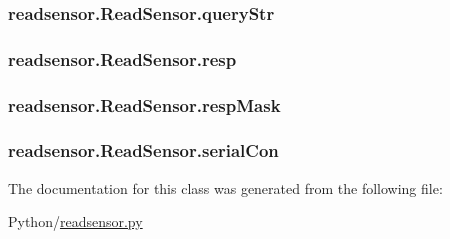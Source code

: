 \subsubsection[{\texorpdfstring{query\+Str}{queryStr}}]{\setlength{\rightskip}{0pt plus 5cm}readsensor.\+Read\+Sensor.\+query\+Str}\hypertarget{classreadsensor_1_1ReadSensor_ac90ad89a36244ff79ec5de39250dbe65}{}\label{classreadsensor_1_1ReadSensor_ac90ad89a36244ff79ec5de39250dbe65}
\subsubsection[{\texorpdfstring{resp}{resp}}]{\setlength{\rightskip}{0pt plus 5cm}readsensor.\+Read\+Sensor.\+resp}\hypertarget{classreadsensor_1_1ReadSensor_a3bfdf8d80b9b2c6e3756546f66684543}{}\label{classreadsensor_1_1ReadSensor_a3bfdf8d80b9b2c6e3756546f66684543}
\subsubsection[{\texorpdfstring{resp\+Mask}{respMask}}]{\setlength{\rightskip}{0pt plus 5cm}readsensor.\+Read\+Sensor.\+resp\+Mask}\hypertarget{classreadsensor_1_1ReadSensor_a2add837e5b36f9242b3481f30be5ace9}{}\label{classreadsensor_1_1ReadSensor_a2add837e5b36f9242b3481f30be5ace9}
\subsubsection[{\texorpdfstring{serial\+Con}{serialCon}}]{\setlength{\rightskip}{0pt plus 5cm}readsensor.\+Read\+Sensor.\+serial\+Con}\hypertarget{classreadsensor_1_1ReadSensor_ab85a47186a692e87ed91dfbd6421ac9f}{}\label{classreadsensor_1_1ReadSensor_ab85a47186a692e87ed91dfbd6421ac9f}


The documentation for this class was generated from the following file\+:\begin{DoxyCompactItemize}
\item 
Python/\hyperlink{readsensor_8py}{readsensor.\+py}\end{DoxyCompactItemize}
